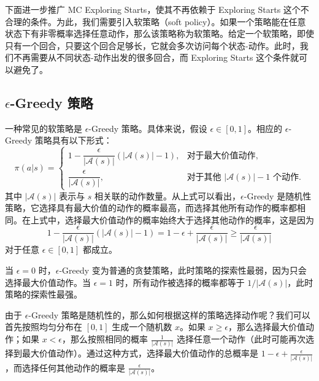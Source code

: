 下面进一步推广 MC Exploring Starts，使其不再依赖于 Exploring Starts 这个不合理的条件。为此，我们需要引入软策略（soft policy）。如果一个策略能在任意状态下有非零概率选择任意动作，那么该策略称为软策略。给定一个软策略，即使只有一个回合，只要这个回合足够长，它就会多次访问每个状态-动作。此时，我们不再需要从不同状态-动作出发的很多回合，而 Exploring Starts 这个条件就可以避免了。

\subsection{\texorpdfstring{$\epsilon$}{epsilon}-Greedy 策略}
\label{sec:rl-mc-epsilon-greedy-policy}

一种常见的软策略是 $\epsilon$-Greedy 策略。具体来说，假设 $\epsilon \in [0,1]$。相应的 $\epsilon$-Greedy 策略具有以下形式：
\begin{equation}
\pi(a|s) = \begin{cases}
1 - \dfrac{\epsilon}{|\mathcal{A}(s)|}(|\mathcal{A}(s)| - 1), & \text{对于最大价值动作}, \\[2ex]
\dfrac{\epsilon}{|\mathcal{A}(s)|}, & \text{对于其他 } |\mathcal{A}(s)| - 1 \text{ 个动作}.
\end{cases}
\end{equation}
其中 $|\mathcal{A}(s)|$ 表示与 $s$ 相关联的动作数量。从上式可以看出，$\epsilon$-Greedy 是随机性策略，它选择具有最大价值的动作的概率最高，而选择其他所有动作的概率都相同。在上式中，选择最大价值动作的概率始终大于选择其他动作的概率，这是因为
\begin{equation}
1 - \frac{\epsilon}{|\mathcal{A}(s)|}(|\mathcal{A}(s)| - 1) = 1 - \epsilon + \frac{\epsilon}{|\mathcal{A}(s)|} \geqslant \frac{\epsilon}{|\mathcal{A}(s)|}
\end{equation}
对于任意 $\epsilon \in [0,1]$ 都成立。

当 $\epsilon = 0$ 时，$\epsilon$-Greedy 变为普通的贪婪策略，此时策略的探索性最弱，因为只会选择最大价值动作。当 $\epsilon = 1$ 时，所有动作被选择的概率都等于 $1 / |\mathcal{A}(s)|$，此时策略的探索性最强。

由于 $\epsilon$-Greedy 策略是随机性的，那么如何根据这样的策略选择动作呢？我们可以首先按照均匀分布在 $[0,1]$ 生成一个随机数 $x$。如果 $x \geqslant \epsilon$，那么选择最大价值动作；如果 $x < \epsilon$，那么按照相同的概率 $\frac{1}{|\mathcal{A}(s)|}$ 选择任意一个动作（此时可能再次选择到最大价值动作）。通过这种方式，选择最大价值动作的总概率是 $1 - \epsilon + \frac{\epsilon}{|\mathcal{A}(s)|}$，而选择任何其他动作的概率是 $\frac{\epsilon}{|\mathcal{A}(s)|}$。


